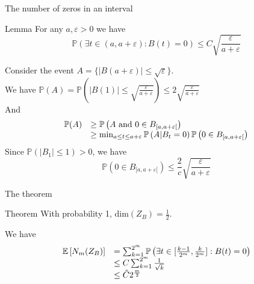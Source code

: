 \documentclass[t]{beamer}
\begin{document}
\begin{frame}{The number of zeros in an interval}
    \begin{block}{Lemma}
        For any $a, \varepsilon > 0$ we have
        $$
        \mathbb{P}(\exists t \in (a, a+\varepsilon):B(t) = 0) \le C\sqrt{\frac{\varepsilon}{a+\varepsilon}}
        $$
    \end{block}
    Consider the event $A = \{ |B(a+\varepsilon)| \le \sqrt{\varepsilon} \}$.\\
    We have $\mathbb{P}(A) = \mathbb{P}\left( |B(1)| \le \sqrt{\frac{\varepsilon}{a+\varepsilon}} \right) \le 2\sqrt{\frac{\varepsilon}{a+\varepsilon}}$\\
    And 
    $$
    \begin{array}{r l}
        \mathbb{P}(A) & \ge \mathbb{P}\left( A \mbox{ and } 0 \in B_{[a, a+\varepsilon[} \right)\\
            & \ge \min_{a\le t \le a+\varepsilon} \mathbb{P}\left( A|B_t = 0 \right)\mathbb{P}\left( 0 \in B_{[a, a+\varepsilon[} \right)
    \end{array}
    $$
    Since $\mathbb{P}\left( |B_1| \le 1 \right) > 0$, we have
    $$
    \mathbb{P}\left( 0 \in B_{[a, a+\varepsilon[} \right) \le \frac{2}{c}\sqrt{\frac{\varepsilon}{a+\varepsilon}}
    $$

\end{frame}

\begin{frame}{The theorem}
    \begin{block}{Theorem}
        With probability 1, dim$(Z_B) = \frac{1}{2}$.
    \end{block}
    We have 
    $$
    \begin{array}{r l}
    \mathbb{E}\left[ N_m(Z_B) \right] &  = \sum_{k=1}^{2^m} \mathbb{P}\left( \exists t \in [\frac{k-1}{2^m}, \frac{k}{2^m}] : B(t) = 0 \right)\\
     & \le C\sum_{k=1}^{2^m} \frac{1}{\sqrt{k}}\\
     & \le \tilde{C} 2^{\frac{m}{2}}
    \end{array}
    $$
\end{frame}
\end{document}
